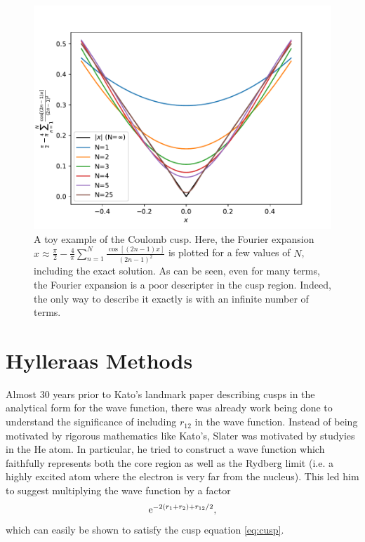 \begin{figure}[htbp]
    \centering
    \includegraphics{figures/explicit/cusp.pdf}
    \caption{A toy example of the Coulomb cusp. Here, the Fourier expansion $x\approx\frac{\pi}{2} - \frac {4}{\pi} \sum_{n=1}^N\frac{\cos[(2n-1)x]}{(2n-1)^2}$ is plotted for a few values of $N$, including the exact solution. As can be seen, even for many terms, the Fourier expansion is a poor descripter in the cusp region. Indeed, the only way to describe it exactly is with an infinite number of terms.}
    \label{fig:cusp}
\end{figure}

\section{Hylleraas Methods}

Almost 30 years prior to Kato's landmark paper describing cusps in the analytical form for the wave function, there was already work being done to understand the significance of including $r_{12}$ in the wave function. Instead of being motivated by rigorous mathematics like Kato's, Slater was motivated by studyies in the He atom. In particular, he tried to construct a wave function which faithfully represents both the core region as well as the Rydberg limit (i.e. a highly excited atom where the electron is very far from the nucleus).\cite{kongExplicitly2012,grynbergIntroduction2010,slaterCentralFieldsRydberg1928,slaterNormal1928} This led him to suggest multiplying the wave function by a factor
\begin{equation}
    \mathrm{e}^{-2(r_1+r_2)+r_{12}/2},
\end{equation}
which can easily be shown to satisfy the cusp equation \eqref{eq:cusp}.

